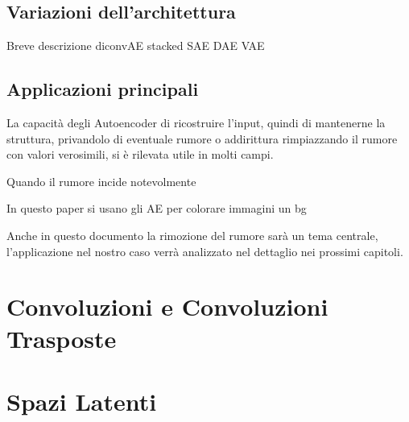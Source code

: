
\subsection{Variazioni dell'architettura}
Breve descrizione diconvAE stacked SAE DAE VAE


\subsection{Applicazioni principali}

La capacità degli Autoencoder di ricostruire l'input, quindi di mantenerne la struttura, privandolo di eventuale rumore o addirittura rimpiazzando il rumore con valori verosimili, si è rilevata utile in molti campi.

Quando il rumore incide notevolmente

In questo paper si usano gli AE per colorare immagini un bg

Anche in questo documento la rimozione del rumore sarà un tema centrale, l'applicazione nel nostro caso verrà analizzato nel dettaglio nei prossimi capitoli.









\section {Convoluzioni e Convoluzioni Trasposte}
\section {Spazi Latenti}

